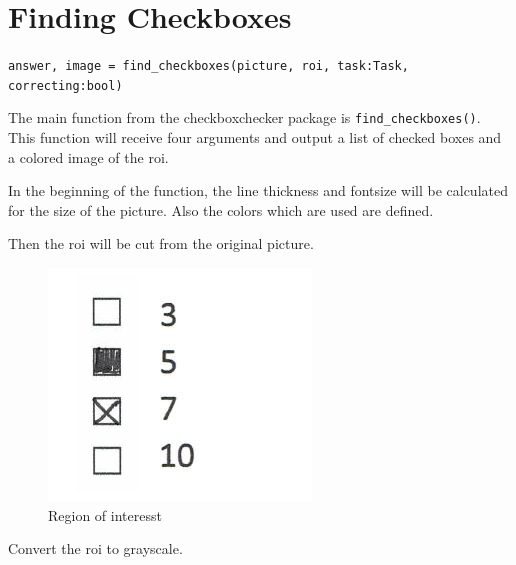 \author{Florian Müller}
\section {Finding Checkboxes}

\texttt{answer, image = find\_checkboxes(picture, roi, task:Task, correcting:bool)}

The main function from the checkboxchecker package is \texttt{find\_checkboxes()}.
This function will receive four arguments and output a list of checked boxes and a colored image of the roi.

In the beginning of the function, the line thickness and fontsize will be calculated for the size of the picture.
Also the colors which are used are defined.

Then the roi will be cut from the original picture.

\begin{figure}[H]
    \centering
    \begin{minipage}[b]{.4\linewidth}
        \includegraphics[width=\linewidth]{src/chapters/developer/media/cbc_live/cbc_roim.png}
        \caption{Region of interesst}
    \end{minipage}
\end{figure}

Convert the roi to grayscale.

